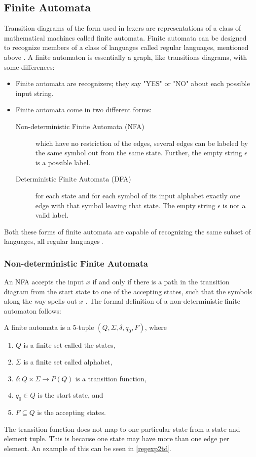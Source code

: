 \subsection{Finite Automata}
Transition diagrams of the form used in lexers are representations of a class 
of mathematical machines called finite automata. Finite automata can be 
designed to recognize members of a class of languages called regular languages, 
mentioned above \cite{sebesta2012}.
A finite automaton is essentially a graph, like transitions diagrams, with some 
differences:
\begin{itemize}
  \item Finite automata are recognizers; they say "YES" or "NO" about 
each possible input string.
  \item Finite automata come in two different forms:
    \begin{description}
      \item [Non-deterministic Finite Automata (NFA)] which have no restriction 
of the edges, several edges can be labeled by the same symbol out from the 
same state. Further, the empty string $\epsilon$ is a possible label. 
      \item [Deterministic Finite Automata (DFA)] for each state and for each 
symbol of its input alphabet exactly one edge with that symbol leaving that 
state. The empty string $\epsilon$ is not a valid label.
    \end{description}
\end{itemize}
Both these forms of finite automata are capable of recognizing the same 
subset of languages, all regular languages \cite{Aho2006}.

\subsubsection{Non-deterministic Finite Automata}
An NFA accepts the input $x$ if and only if there is a path in the transition 
diagram from the start state to one of the accepting states, such that the 
symbols along the way spells out $x$ \cite{Aho2006}.
The formal definition of a non-deterministic finite automaton follows:
\begin{definition} \label{finiteAutomataDef}
A finite automata is a 5-tuple $(Q, \Sigma, \delta, q_0, F)$, where
\begin{enumerate}
  \item $Q$ is a finite set called the states,
  \item $\Sigma$ is a finite set called alphabet,
  \item $\delta: Q \times \Sigma \to P(Q)$ is a transition function,
  \item $q_0 \in Q$ is the start state, and
  \item $F \subseteq Q$ is the accepting states.
\end{enumerate} 
\end{definition}
The transition function does not map to one particular state from a
state and element tuple. This is because one state may have more than one edge
per element. An example of this can be seen in \cref{regexp2td}.

